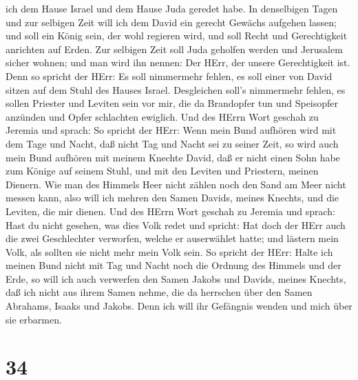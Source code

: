 ich dem Hause Israel und dem Hause Juda geredet habe.  In
denselbigen Tagen und zur selbigen Zeit will ich dem David ein gerecht
Gewächs aufgehen lassen; und soll ein König sein, der wohl regieren
wird, und soll Recht und Gerechtigkeit anrichten auf Erden.
 Zur selbigen Zeit soll Juda geholfen werden und Jerusalem
sicher wohnen; und man wird ihn nennen: Der HErr, der unsere
Gerechtigkeit ist.  Denn so spricht der HErr: Es soll
nimmermehr fehlen, es soll einer von David sitzen auf dem Stuhl des
Hauses Israel.  Desgleichen soll's nimmermehr fehlen, es
sollen Priester und Leviten sein vor mir, die da Brandopfer tun und
Speisopfer anzünden und Opfer schlachten ewiglich.  Und des
HErrn Wort geschah zu Jeremia und sprach:  So spricht der
HErr: Wenn mein Bund aufhören wird mit dem Tage und Nacht, daß nicht Tag
und Nacht sei zu seiner Zeit,  so wird auch mein Bund
aufhören mit meinem Knechte David, daß er nicht einen Sohn habe zum
Könige auf seinem Stuhl, und mit den Leviten und Priestern, meinen
Dienern.  Wie man des Himmels Heer nicht zählen noch den
Sand am Meer nicht messen kann, also will ich mehren den Samen Davids,
meines Knechts, und die Leviten, die mir dienen.  Und des
HErrn Wort geschah zu Jeremia und sprach:  Hast du nicht
gesehen, was dies Volk redet und spricht: Hat doch der HErr auch die
zwei Geschlechter verworfen, welche er auserwählet hatte; und lästern
mein Volk, als sollten sie nicht mehr mein Volk sein.  So
spricht der HErr: Halte ich meinen Bund nicht mit Tag und Nacht noch die
Ordnung des Himmels und der Erde,  so will ich auch
verwerfen den Samen Jakobs und Davids, meines Knechts, daß ich nicht aus
ihrem Samen nehme, die da herrschen über den Samen Abrahams, Isaaks und
Jakobs. Denn ich will ihr Gefängnis wenden und mich über sie erbarmen.

\hypertarget{section-33}{%
\section{34}\label{section-33}}

